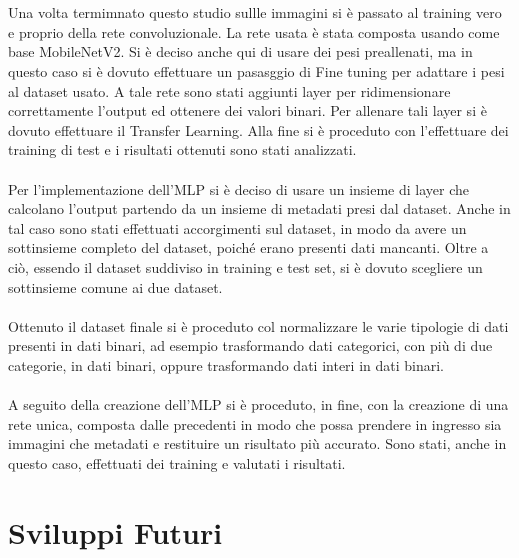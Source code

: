 \\\\
Una volta termimnato questo studio sullle immagini si è passato al training vero e proprio della rete convoluzionale.
La rete usata è stata composta usando come base MobileNetV2. Si è deciso anche qui di usare dei pesi preallenati, ma in questo caso si è dovuto 
effettuare un pasasggio di Fine tuning per adattare i pesi al dataset usato. A tale rete sono stati aggiunti layer per ridimensionare correttamente l'output ed ottenere 
dei valori binari.
Per allenare tali layer si è dovuto effettuare il Transfer Learning. 
Alla fine si è proceduto con l'effettuare dei training di test e i risultati ottenuti sono stati analizzati.
\\\\
Per l'implementazione dell'MLP si è deciso di usare un insieme di layer che calcolano l'output partendo da un insieme di metadati presi dal dataset.
Anche in tal caso sono stati effettuati accorgimenti sul dataset, in modo da avere un sottinsieme completo del dataset, poiché erano presenti dati mancanti.
Oltre a ciò, essendo il dataset suddiviso in training e test set, si è dovuto scegliere un sottinsieme comune ai due dataset.
\\\\
Ottenuto il dataset finale si è proceduto col normalizzare le varie tipologie di dati presenti in dati binari, ad esempio trasformando dati categorici, con più di due categorie, in dati binari, oppure 
trasformando dati interi in dati binari.
\\\\
A seguito della creazione dell'MLP si è proceduto, in fine, con la creazione di una rete unica, composta dalle precedenti in modo 
che possa prendere in ingresso sia immagini che metadati e restituire un risultato più accurato. Sono stati, anche in questo caso, effettuati 
dei training e valutati i risultati.
\section{Sviluppi Futuri}